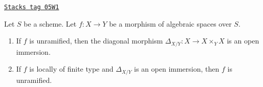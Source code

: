 \begin{lemma}
\label{spaces-morphisms-lemma-diagonal-unramified-morphism}
\href{https://stacks.math.columbia.edu/tag/05W1}{\texttt{Stacks tag 05W1}}

Let $S$ be a scheme.
Let $f : X \to Y$ be a morphism of algebraic spaces over $S$.
\begin{enumerate}
\item If $f$ is unramified, then the diagonal morphism
$\Delta_{X/Y} : X \to X \times_Y X$ is an open immersion.
\item If $f$ is locally of finite type
and $\Delta_{X/Y}$ is an open immersion, then $f$ is unramified.
\end{enumerate}
\end{lemma}

